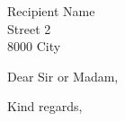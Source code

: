 \documentclass[paper=a4,fromalign=right,fromphone=false]{scrlttr2}
\begin{document}
\begin{letter}{Recipient Name\\Street 2\\8000 City}
\opening{Dear Sir or Madam,}

\closing{Kind regards,}
\end{letter}
\end{document}

